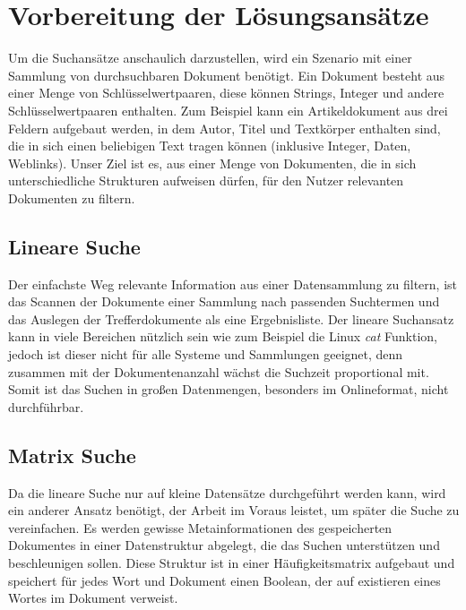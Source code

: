 \section[Vorbereitung der Lösungsansätze]{Vorbereitung der Lösungsansätze}
Um die Suchansätze anschaulich darzustellen, wird ein Szenario mit einer
Sammlung von durchsuchbaren Dokument benötigt. Ein Dokument besteht aus
einer Menge von Schlüsselwertpaaren, diese können Strings, Integer und
andere Schlüsselwertpaaren enthalten. Zum Beispiel kann ein
Artikeldokument aus drei Feldern aufgebaut werden, in dem Autor, Titel
und Textkörper enthalten sind, die in sich einen beliebigen Text tragen
können (inklusive Integer, Daten, Weblinks). 
\newline
Unser Ziel ist es, aus einer Menge von Dokumenten, die in sich
unterschiedliche Strukturen aufweisen dürfen, für den Nutzer relevanten
Dokumenten zu filtern.


\subsection[Lineare Suche]{Lineare Suche}
Der einfachste Weg relevante Information aus einer Datensammlung zu
filtern, ist das Scannen der Dokumente einer Sammlung nach passenden
Suchtermen und das Auslegen der Trefferdokumente als eine
Ergebnisliste. Der lineare Suchansatz kann in viele Bereichen nützlich
sein wie zum Beispiel die Linux \textit{cat} Funktion, jedoch ist dieser nicht
für alle Systeme und Sammlungen geeignet, denn zusammen mit der
Dokumentenanzahl wächst die Suchzeit proportional mit. 
\newline
Somit ist das Suchen in großen Datenmengen, %
besonders im Onlineformat, nicht durchführbar.

\subsection[Matrix Suche]{Matrix Suche}

Da die lineare Suche nur auf kleine Datensätze durchgeführt werden kann,
wird ein anderer Ansatz benötigt, der Arbeit im Voraus leistet, um
später die Suche zu vereinfachen. Es werden gewisse Metainformationen
des gespeicherten Dokumentes in einer Datenstruktur abgelegt, die das
Suchen unterstützen und beschleunigen sollen. 
\newline
Diese Struktur ist in einer Häufigkeitsmatrix aufgebaut und speichert
für jedes Wort und Dokument einen Boolean, der auf existieren eines
Wortes im Dokument verweist.


